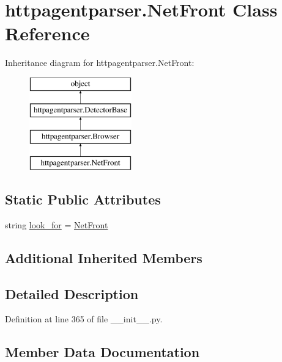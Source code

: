 \hypertarget{classhttpagentparser_1_1_net_front}{}\section{httpagentparser.\+Net\+Front Class Reference}
\label{classhttpagentparser_1_1_net_front}
Inheritance diagram for httpagentparser.\+Net\+Front\+:\begin{figure}[H]
\begin{center}
\leavevmode
\includegraphics[height=4.000000cm]{classhttpagentparser_1_1_net_front}
\end{center}
\end{figure}
\subsection*{Static Public Attributes}
\begin{DoxyCompactItemize}
\item 
string \hyperlink{classhttpagentparser_1_1_net_front_ae1c888d2d765d69fff36134988921241}{look\+\_\+for} = \textquotesingle{}\hyperlink{classhttpagentparser_1_1_net_front}{Net\+Front}\textquotesingle{}
\end{DoxyCompactItemize}
\subsection*{Additional Inherited Members}


\subsection{Detailed Description}


Definition at line 365 of file \+\_\+\+\_\+init\+\_\+\+\_\+.\+py.



\subsection{Member Data Documentation}
\hypertarget{classhttpagentparser_1_1_net_front_ae1c888d2d765d69fff36134988921241}{}\label{classhttpagentparser_1_1_net_front_ae1c888d2d765d69fff36134988921241} 
